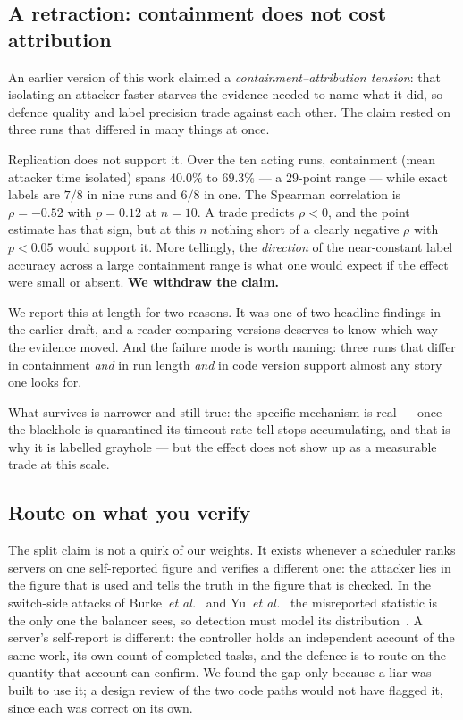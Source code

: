 \documentclass[10pt,twocolumn,letterpaper]{article}
\newcommand{\etal}{\textit{et al.}}
\begin{document}
\subsection{A retraction: containment does not cost attribution}
\label{sec:disc:retract}
An earlier version of this work claimed a \emph{containment--attribution
tension}: that isolating an attacker faster starves the evidence needed to name
what it did, so defence quality and label precision trade against each other.
The claim rested on three runs that differed in many things at once.

Replication does not support it. Over the ten acting runs, containment (mean
attacker time isolated) spans $40.0\%$ to $69.3\%$ --- a $29$-point range --- while
exact labels are $7/8$ in nine runs and $6/8$ in one. The Spearman correlation
is $\rho = -0.52$ with $p = 0.12$ at $n = 10$. A trade predicts $\rho < 0$, and
the point estimate has that sign, but at this $n$ nothing short of a clearly
negative $\rho$ with $p < 0.05$ would support it. More tellingly, the
\emph{direction} of the near-constant label accuracy across a large containment
range is what one would expect if the effect were small or absent.
\textbf{We withdraw the claim.} 

We report this at length for two reasons. It was one of two headline findings
in the earlier draft, and a reader comparing versions deserves to know which
way the evidence moved. And the failure mode is worth naming: three runs that
differ in containment \emph{and} in run length \emph{and} in code version
support almost any story one looks for.

What survives is narrower and still true: the specific mechanism is real ---
once the blackhole is quarantined its timeout-rate tell stops accumulating, and
that is why it is labelled grayhole --- but the effect does not show up as a
measurable trade at this scale.

\subsection{Route on what you verify}
\label{sec:disc:verify}
The split claim is not a quirk of our weights. It exists whenever a scheduler
ranks servers on one self-reported figure and verifies a different one: the
attacker lies in the figure that is used and tells the truth in the figure
that is checked. In the switch-side attacks of
Burke~\etal~\cite{burke2023misreporting} and Yu~\etal~\cite{yu2024stealthy} the
misreported statistic is the only one the balancer sees, so detection must
model its distribution~\cite{saha2025misreporting}. A server's self-report is
different: the controller holds an independent account of the same work, its
own count of completed tasks, and the defence is to route on the quantity that
account can confirm. We found the gap only because a liar was built to use it;
a design review of the two code paths would not have flagged it, since each
was correct on its own.
\end{document}
